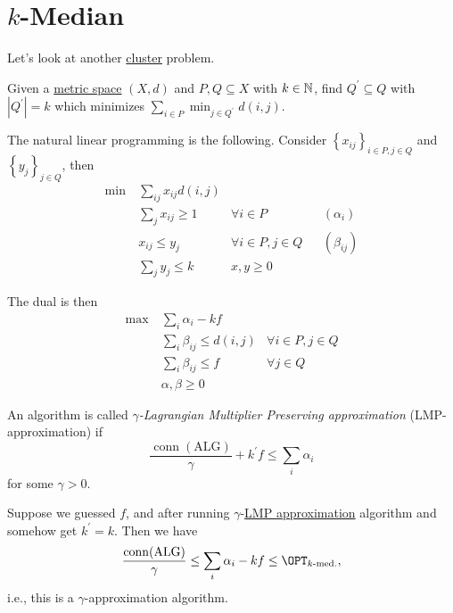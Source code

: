 \section{\(k\)-Median}

Let's look at another \hyperref[def:cluster]{cluster} problem.

\begin{problem}[\(k\)-median]\label{prb:k-median}
Given a \hyperref[def:metric]{metric space} \((X, d)\) and \(P, Q\subseteq X\) with \(k\in \mathbb{\MakeUppercase{n}} \), find \(Q^\prime \subseteq Q\) with \(\left\vert Q^\prime  \right\vert = k\) which minimizes \(\sum_{i\in P} \min _{j\in Q^\prime } d(i, j)\).
\end{problem}

The natural linear programming is the following. Consider \(\left\{ x_{ij}  \right\}_{i\in P, j\in Q} \) and \(\left\{ y_j \right\}_{j\in Q} \), then
\begin{align*}
	\min~ & \sum_{ij} x_{ij} d(i, j)                                             \\
	      & \sum_{j} x_{ij} \geq 1   & \forall i\in P         &  & (\alpha _i)   \\
	      & x_{ij} \leq y_j          & \forall i\in P, j\in Q &  & (\beta _{ij}) \\
	      & \sum_{j} y_j \leq k
	      & x, y\geq 0
\end{align*}

The dual is then
\begin{align*}
	\max~ & \sum_{i} \alpha _i - kf                                    \\
	      & \sum_{i} \beta _{ij} \leq d(i, j) & \forall i\in P, j\in Q \\
	      & \sum_{i} \beta _{ij} \leq f       & \forall j\in Q         \\
	      & \alpha , \beta \geq 0
\end{align*}

\begin{definition}\label{def:LMP}
	An algorithm is called \emph{\(\gamma \)-Lagrangian Multiplier Preserving approximation} (LMP-approximation) if
	\[
		\frac{\mathop{\mathrm{conn}}(\text{ALG})}{\gamma }+ k^\prime f \leq \sum_{i} \alpha _i
	\]
	for some \(\gamma > 0\).
\end{definition}

\begin{remark}
	Suppose we guessed \(f\), and after running \(\gamma\)-\hyperref[def:LMP]{LMP approximation} algorithm and somehow get \(k^\prime = k\). Then we have
	\[
		\frac{\mathop{\mathrm{conn}}(\mathrm{ALG})}{\gamma } \leq \sum_{i} \alpha _i - kf \leq \OPT_{\text{\(k\)-med.}},
	\]
	i.e., this is a \(\gamma \)-approximation algorithm.
\end{remark}

